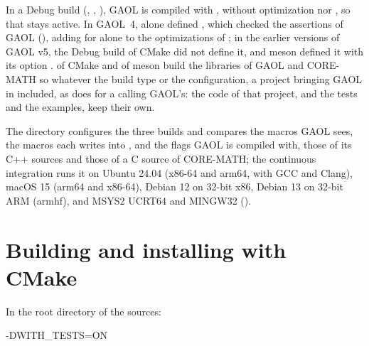 \medskip
In a Debug build (,
, ), GAOL is
compiled with , without optimization nor , so that
 stays active. In GAOL~4,  alone
defined , which checked the assertions of GAOL
(), adding  for
 alone to the optimizations of ; in the
earlier versions of GAOL v5, the Debug build of CMake did not define it, and
meson defined it with its option .\newinvfive{}  of CMake and
 of meson build the libraries of GAOL and CORE-MATH so
whatever the build type or the configuration, a project bringing GAOL in
included, as  does for a  calling
GAOL's: the code of that project, and the tests and the examples, keep their
own.

\medskip
The directory  configures the three builds and compares
the macros GAOL sees, the macros each writes into
, and the flags GAOL is compiled with, those
of its C++ sources and those of a C source of CORE-MATH; the continuous
integration runs it on Ubuntu 24.04 (x86-64 and arm64, with GCC and Clang),
macOS 15 (arm64 and x86-64), Debian 12 on 32-bit x86, Debian 13 on 32-bit ARM
(armhf), and MSYS2 UCRT64 and MINGW32 ().\newinvfive

\section{Building and installing with CMake}\label{sec:cmake}
%

In the root directory of the sources:

\begin{cmdshell}
        -DWITH_TESTS=ON
\end{cmdshell}

